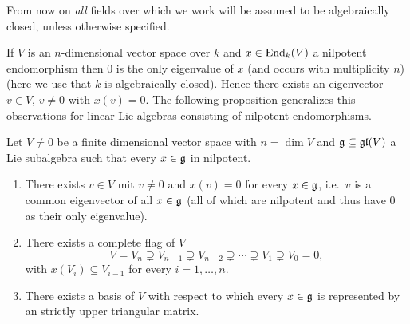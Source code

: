 From now on \emph{all} fields over which we work will be assumed to be algebraically closed, unless otherwise specified.


If $V$ is an $n$-dimensional vector space over $k$ and $x \in \operatorname{End}_k(V)$ a nilpotent endomorphism then $0$ is the only eigenvalue of $x$ (and occurs with multiplicity $n$) (here we use that $k$ is algebraically closed). Hence there exists an eigenvector $v \in V$, $v \neq 0$ with $x(v) = 0$. The following proposition generalizes this observations for linear Lie algebras consisting of nilpotent endomorphisms.


\begin{prop}\label{prop: stuff for engels theorem}
 Let $V \neq 0$ be a finite dimensional vector space with $n = \dim V$ and $\mathfrak{g} \subseteq \mathfrak{gl}(V)$ a Lie subalgebra such that every $x \in \mathfrak{g}$ in nilpotent.
 \begin{enumerate}[leftmargin=*]
  \item
   There exists $v \in V$ mit $v \neq 0$ and $x(v) = 0$ for every $x \in \mathfrak{g}$, i.e.\ $v$ is a common eigenvector of all $x \in \mathfrak{g}$ (all of which are nilpotent and thus have $0$ as their only eigenvalue).
  \item
   There exists a complete flag of $V$
   \[
    V = V_n \supsetneq V_{n-1} \supsetneq V_{n-2} \supsetneq \dotsb \supsetneq V_1 \supsetneq V_0 = 0,
   \]
   with $x(V_i) \subseteq V_{i-1}$ for every $i = 1, \dotsc, n$.
  \item
   There exists a basis of $V$ with respect to which every $x \in \mathfrak{g}$ is represented by an strictly upper triangular matrix.
 \end{enumerate}
\end{prop}
